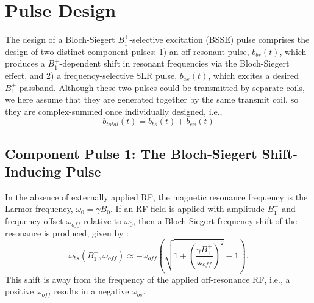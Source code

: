 \documentclass{article}
\newcommand{\bfullt}{b_{total}(t)}
\newcommand{\bext}{b_{ex}(t)}
\newcommand{\bbst}{b_{bs}(t)}
\begin{document}
\section*{Pulse Design}
The design of a Bloch-Siegert $B_1^+$-selective excitation (BSSE) pulse comprises the design of two distinct component pulses: 
1) an off-resonant pulse, $\bbst$, which produces a $B_1^+$-dependent shift in resonant frequencies via the Bloch-Siegert effect, 
and 2) a frequency-selective SLR pulse, $\bext$, which excites a desired $B_1^+$ passband.
Although these two pulses could be transmitted by separate coils, 
we here assume that they are generated together by the same transmit coil, 
so they are complex-summed once individually designed, i.e.,
\begin{equation*}
\bfullt = \bbst + \bext
\end{equation*}

\subsection*{Component Pulse 1: The Bloch-Siegert Shift-Inducing Pulse} 
In the absence of externally applied RF,
the magnetic resonance frequency is the Larmor frequency, $\omega_0 = \gamma B_0$. 
If an RF field is applied with amplitude $B_1^+$ and frequency offset 
$\omega_{off}$ relative to $\omega_0$, 
then a Bloch-Siegert frequency shift of the resonance is produced, given by \cite{Ramsey1955}:
\begin{equation}
\omega_{bs}(B_1^+, \omega_{off}) \approx -\omega_{off}\left(\sqrt{1+\left(\frac{\gamma B_1^+}{\omega_{off}}\right)^2}-1\right).
\label{eq:bsshift}
\end{equation}
This shift is away from the frequency of the applied off-resonance RF, i.e.,
a positive $\omega_{off}$ results in a negative $\omega_{bs}$.
\end{document}
